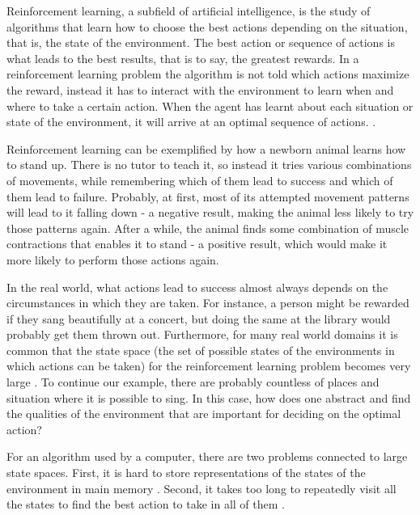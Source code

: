 Reinforcement learning, a subfield of artificial intelligence, is the study of algorithms that learn how to choose the best actions depending on the situation, that is, the state of the environment. The best action or sequence of actions is what leads to the best results, that is to say, the greatest rewards. In a reinforcement learning problem the algorithm is not told which actions maximize the reward, instead it has to interact with the environment to learn when and where to take a certain action. When the agent has learnt about each situation or state of the environment, it will arrive at an optimal sequence of actions. \parencite{barto1998reinforcement}.




Reinforcement learning can be exemplified by how a newborn animal learns how to stand up. There is no tutor to teach it, so instead it tries various combinations of movements, while remembering which of them lead to success and which of them lead to failure. Probably, at first, most of its attempted movement patterns will lead to it falling down - a negative result, making the animal less likely to try those patterns again. After a while, the animal finds some combination of muscle contractions that enables it to stand - a positive result, which would make it more likely to perform those actions again. 

In the real world, what actions lead to success almost always depends on the circumstances in which they are taken. For instance, a person might be rewarded if they sang beautifully at a concert, but doing the same at the library would probably get them thrown out. Furthermore, for many real world domains it is common that the state space (the set of possible states of the environments in which actions can be taken) for the reinforcement learning problem becomes very large \parencite{guestrin2003efficient}. To continue our example, there are probably countless of places and situation where it is possible to sing. In this case, how does one abstract and find the qualities of the environment that are important for deciding on the optimal action? 

For an algorithm used by a computer, there are two problems connected to large state spaces. First, it is hard to store representations of the states of the environment in main memory \parencite{szepesvari2010algorithms}. Second, it takes too long to repeatedly visit all the states to find the best action to take in all of them \parencite{dietterich2013pac}.